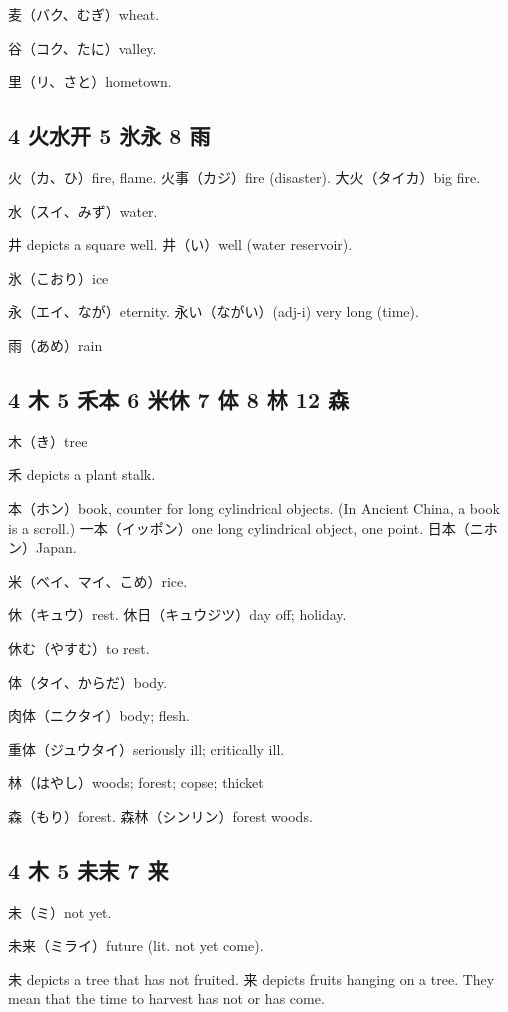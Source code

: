麦（バク、むぎ）wheat.

谷（コク、たに）valley.

里（リ、さと）hometown.

\subsection{4 火水开 5 氷永 8 雨}

火（カ、ひ）fire, flame.
火事（カジ）fire (disaster).
大火（タイカ）big fire.

水（スイ、みず）water.

井 depicts a square well.
井（い）well (water reservoir).

氷（こおり）ice

永（エイ、なが）eternity.
永い（ながい）(adj-i) very long (time).

雨（あめ）rain

\subsection{4 木 5 禾本 6 米休 7 体 8 林 12 森}

木（き）tree

禾 depicts a plant stalk.

本（ホン）book, counter for long cylindrical objects.
(In Ancient China, a book is a scroll.)
一本（イッポン）one long cylindrical object, one point.
日本（ニホン）Japan.

米（ベイ、マイ、こめ）rice.

休（キュウ）rest.
休日（キュウジツ）day off; holiday.

休む（やすむ）to rest.

体（タイ、からだ）body.

肉体（ニクタイ）body; flesh.

重体（ジュウタイ）seriously ill; critically ill.

林（はやし）woods; forest; copse; thicket

森（もり）forest.
森林（シンリン）forest woods.

\subsection{4 木 5 未末 7 来}

未（ミ）not yet.

未来（ミライ）future (lit. not yet come).

未 depicts a tree that has not fruited.
来 depicts fruits hanging on a tree.
They mean that the time to harvest has not or has come.

